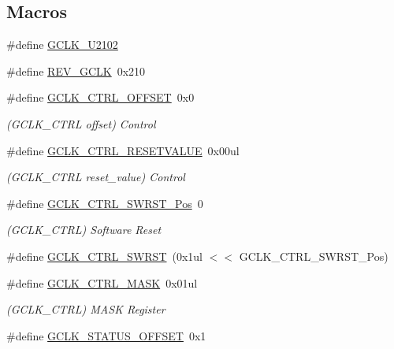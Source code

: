 \subsection*{Macros}
\begin{DoxyCompactItemize}
\item 
\#define \mbox{\hyperlink{group___s_a_m_d21___g_c_l_k_gaca1c1ddf305857f452121b055f1dc890}{G\+C\+L\+K\+\_\+\+U2102}}
\item 
\#define \mbox{\hyperlink{group___s_a_m_d21___g_c_l_k_gad1c1468b7c6ed891f5711fedfef9ec67}{R\+E\+V\+\_\+\+G\+C\+LK}}~0x210
\item 
\#define \mbox{\hyperlink{group___s_a_m_d21___g_c_l_k_ga1e4155316409181e6ee6e88d12cdc90d}{G\+C\+L\+K\+\_\+\+C\+T\+R\+L\+\_\+\+O\+F\+F\+S\+ET}}~0x0
\begin{DoxyCompactList}\small\item\em (G\+C\+L\+K\+\_\+\+C\+T\+RL offset) Control \end{DoxyCompactList}\item 
\#define \mbox{\hyperlink{group___s_a_m_d21___g_c_l_k_ga83d8721ae78e319dd3b6ab2e350a189b}{G\+C\+L\+K\+\_\+\+C\+T\+R\+L\+\_\+\+R\+E\+S\+E\+T\+V\+A\+L\+UE}}~0x00ul
\begin{DoxyCompactList}\small\item\em (G\+C\+L\+K\+\_\+\+C\+T\+RL reset\+\_\+value) Control \end{DoxyCompactList}\item 
\#define \mbox{\hyperlink{group___s_a_m_d21___g_c_l_k_ga4efebabb229142324a17a17d178c8494}{G\+C\+L\+K\+\_\+\+C\+T\+R\+L\+\_\+\+S\+W\+R\+S\+T\+\_\+\+Pos}}~0
\begin{DoxyCompactList}\small\item\em (G\+C\+L\+K\+\_\+\+C\+T\+RL) Software Reset \end{DoxyCompactList}\item 
\#define \mbox{\hyperlink{group___s_a_m_d21___g_c_l_k_ga279d0e7833263a0907ddf09e3600df70}{G\+C\+L\+K\+\_\+\+C\+T\+R\+L\+\_\+\+S\+W\+R\+ST}}~(0x1ul $<$$<$ G\+C\+L\+K\+\_\+\+C\+T\+R\+L\+\_\+\+S\+W\+R\+S\+T\+\_\+\+Pos)
\item 
\#define \mbox{\hyperlink{group___s_a_m_d21___g_c_l_k_ga1149580344c769b492a3965710f14319}{G\+C\+L\+K\+\_\+\+C\+T\+R\+L\+\_\+\+M\+A\+SK}}~0x01ul
\begin{DoxyCompactList}\small\item\em (G\+C\+L\+K\+\_\+\+C\+T\+RL) M\+A\+SK Register \end{DoxyCompactList}\item 
\#define \mbox{\hyperlink{group___s_a_m_d21___g_c_l_k_ga1829e59ccf51b247d4c84f4b53356e59}{G\+C\+L\+K\+\_\+\+S\+T\+A\+T\+U\+S\+\_\+\+O\+F\+F\+S\+ET}}~0x1
$$
\end{DoxyCompactItemize}
